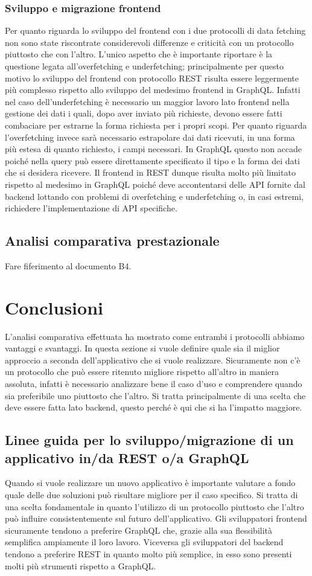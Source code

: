 \subsubsection*{Sviluppo e migrazione frontend}
Per quanto riguarda lo sviluppo del frontend con i due protocolli di data fetching non sono state riscontrate considerevoli differenze e criticità con un protocollo piuttosto che con l'altro. L'unico aspetto che è importante riportare è la questione legata all'overfetching e underfetching; principalmente per questo motivo lo sviluppo del frontend con protocollo REST risulta essere leggermente più complesso rispetto allo sviluppo del medesimo frontend in GraphQL. Infatti nel caso dell'underfetching è necessario un maggior lavoro lato frontend nella gestione dei dati i quali, dopo aver inviato più richieste, devono essere fatti combaciare per estrarne la forma richiesta per i propri scopi. Per quanto riguarda l'overfetching invece sarà necessario estrapolare dai dati ricevuti, in una forma più estesa di quanto richiesto, i campi necessari. In GraphQL questo non accade poiché nella query può essere direttamente specificato il tipo e la forma dei dati che si desidera ricevere. Il frontend in REST dunque risulta molto più limitato rispetto al medesimo in GraphQL poiché deve accontentarsi delle API fornite dal backend lottando con problemi di overfetching e underfetching o, in casi estremi, richiedere l'implementazione di API specifiche.
\subsection{Analisi comparativa prestazionale}
Fare fiferimento al documento B4.
\section{Conclusioni}
L'analisi comparativa effettuata ha mostrato come entrambi i protocolli abbiamo vantaggi e svantaggi. In questa sezione si vuole definire quale sia il miglior approccio a seconda dell'applicativo che si vuole realizzare. Sicuramente non c'è un protocollo che può essere ritenuto migliore rispetto all'altro in maniera assoluta, infatti è necessario analizzare bene il caso d'uso e comprendere quando sia preferibile uno piuttosto che l'altro. Si tratta principalmente di una scelta che deve essere fatta lato backend, questo perché è qui che si ha l'impatto maggiore.
\subsection{Linee guida per lo sviluppo/migrazione di un applicativo in/da REST o/a GraphQL}
Quando si vuole realizzare un nuovo applicativo è importante valutare a fondo quale delle due soluzioni può risultare migliore per il caso specifico. Si tratta di una scelta fondamentale in quanto l'utilizzo di un protocollo piuttosto che l'altro può influire consistentemente sul futuro dell'applicativo. Gli sviluppatori frontend sicuramente tendono a preferire GraphQL che, grazie alla sua flessibilità semplifica ampiamente il loro lavoro. Viceversa gli sviluppatori del backend tendono a preferire REST in quanto molto più semplice, in esso sono presenti molti più strumenti rispetto a GraphQL.
